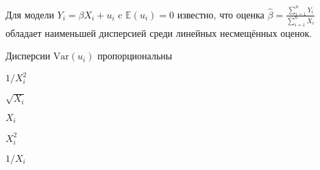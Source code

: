 
\begin{question}
Для модели \(Y_i = \beta X_i + u_i\) c \(\mathbb{E}(u_i) = 0\) известно,
что оценка \(\hat \beta = \frac{\sum_{i=1}^n Y_i}{\sum_{i=1}^n X_i}\) обладает наименьшей дисперсией
среди линейных несмещённых оценок.

Дисперсии \(\mathrm{Var}(u_i)\) пропорциональны
\begin{answerlist}
  \item \(1/X_i^2\)
  \item \(\sqrt{X_i}\)
  \item \(X_i\)
  \item \(X_i^2\)
  \item \(1/X_i\)
\end{answerlist}
\end{question}


